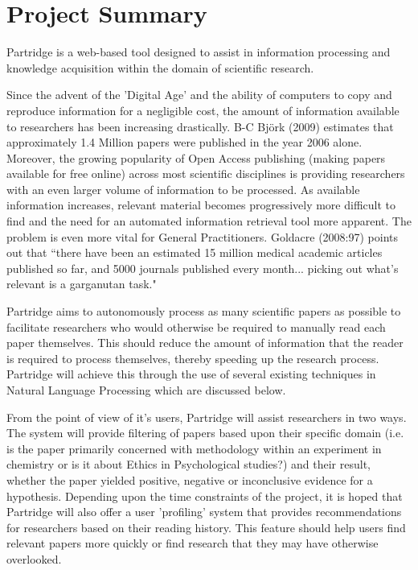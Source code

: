 \documentclass[12pt,a4paper]{article}
\begin{document}




\setlength{\parindent}{0pt}
\setlength{\parskip}{1.5ex plus 0.5ex minus 0.2ex}

\tableofcontents

\pagebreak

\section{Project Summary}

Partridge is a web-based tool designed to assist in information processing and knowledge
acquisition within the domain of scientific research.

Since the advent of the 'Digital Age' and the ability of computers to copy and
reproduce information for a negligible cost, the amount of information
available to researchers has been increasing drastically.  B-C Bj\"{o}rk (2009)
estimates that approximately 1.4 Million papers were published in the year 2006
alone\cite{bjork2009}. Moreover, the growing popularity of Open Access
publishing (making papers available for free online\cite{Suber2012}) across
most scientific disciplines\cite{bjork2009}\cite{harnad2004comparing} is
providing researchers with an even larger volume of information to be
processed. As available information increases, relevant material becomes
progressively more difficult to find and the need for an automated information
retrieval tool more apparent. The problem is even more vital for General
Practitioners. Goldacre (2008:97) points out that ``there have been an
estimated 15 million medical academic articles published so far, and 5000
journals published every month... picking out what's relevant is a garganutan
task."\cite{goldacre2009bad} 

Partridge aims to autonomously process as many scientific papers as possible to
facilitate researchers who would otherwise be required to manually read each
paper themselves. This should reduce the amount of information that the reader
is required to process themselves, thereby speeding up the research process.
Partridge will achieve this through the use of several existing techniques in
Natural Language Processing which are discussed below.

From the point of view of it's users, Partridge will assist researchers in two
ways. The system will provide filtering of papers based upon their
specific domain (i.e. is the paper primarily concerned with methodology within
an experiment in chemistry or is it about Ethics in Psychological studies?) and
their result, whether the paper yielded positive, negative or inconclusive
evidence for a hypothesis. Depending upon the time constraints of the
project, it is hoped that Partridge will also offer a user 'profiling' system
that provides recommendations for researchers based on their reading history.
This feature should help users find relevant papers more quickly or find
research that they may have otherwise overlooked.
\end{document}
